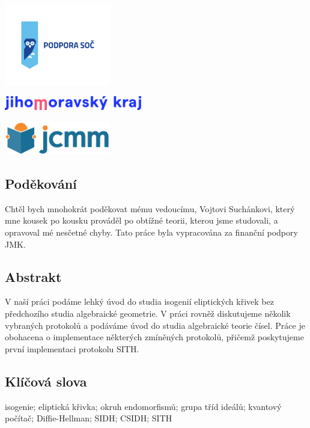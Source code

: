 \documentclass[12pt]{report}
\begin{document}
\newpage
\thispagestyle{empty}
\begin{center}
\includegraphics[width=0.35\textwidth]{podpora_soc-horizontalni.png}
\end{center}
\vspace*{1.5cm}
\begin{center}
\includegraphics[width=0.45\textwidth]{logo_JMK_pruhledne.png}
\end{center}
\vspace*{2.2cm}
\begin{center}
\includegraphics[width=0.35\textwidth]{jcmm-logotype-positive1.png}
\end{center}
\vspace*{6.5cm}
\subsection*{Poděkování}
Chtěl bych mnohokrát poděkovat mému vedoucímu, Vojtovi Suchánkovi, který mne kousek po kousku prováděl po obtížné teorii, kterou jsme studovali, a opravoval mé nesčetné chyby. Tato práce byla vypracována za finanční podpory JMK.


\newpage
\thispagestyle{empty}
\subsection*{Abstrakt}
V naší práci podáme lehký úvod do studia isogenií eliptických křivek bez předchozího studia algebraické geometrie. V práci rovněž diskutujeme několik vybraných protokolů a podáváme úvod do studia algebraické teorie čísel. Práce je obohacena o implementace některých zmíněných protokolů, přičemž poskytujeme první implementaci protokolu SITH.


\subsection*{Klíčová slova}
isogenie; eliptická křivka; okruh endomorfismů; grupa tříd ideálů; kvantový počítač; Diffie-Hellman; SIDH; CSIDH; SITH
\end{document}
